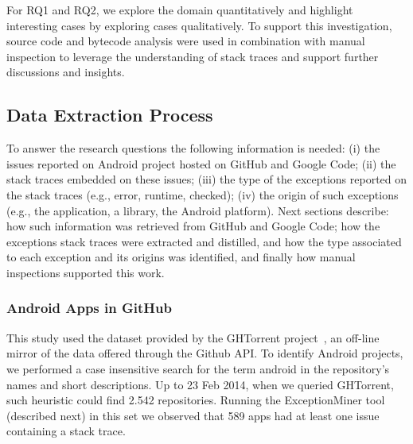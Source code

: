 \documentclass[conference]{IEEEtran}
\begin{document}
For RQ1 and RQ2, we explore the domain quantitatively and highlight interesting cases by 
exploring cases qualitatively. To support this investigation, source code and bytecode 
analysis were used in combination with manual inspection to leverage the  understanding 
of stack traces and support further discussions and insights. 


\subsection{Data Extraction Process}
\label{sec:miningproc}

To answer the research questions the following information is needed: (i) the issues reported on Android project hosted on 
GitHub and Google Code; (ii) the stack traces embedded on these issues; (iii) the type of the exceptions
 reported on the stack traces (e.g., error, runtime, checked); (iv) the origin of such exceptions 
(e.g., the application, a library, the Android platform). Next sections describe: how such information 
was retrieved from GitHub and Google Code; how the exceptions stack traces were extracted and distilled,
 and how the type associated to each exception and its origins was identified, and finally how manual
inspections supported this work.


\subsubsection{Android Apps in GitHub}
\label{sec:git}


This study used the dataset provided by the GHTorrent project~\cite{Gousi13}, 
an off-line mirror of the data  offered through the Github API.  
To identify Android projects, we performed a case insensitive search for the
term \textsf{android} in the repository's names and short descriptions.  
Up to 23 Feb 2014,  when we queried GHTorrent, such heuristic could
 find 2.542 repositories. Running the ExceptionMiner tool (described next)
 in this set we observed that 589 apps had at least one issue containing a stack trace.
\end{document}
